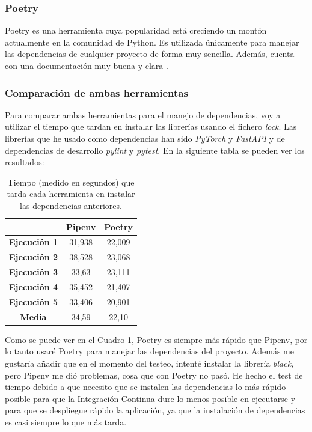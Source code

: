 \subsubsection*{Poetry}

Poetry es una herramienta cuya popularidad está creciendo un montón actualmente en la comunidad de Python. Es utilizada únicamente para manejar las dependencias de cualquier proyecto de forma muy sencilla. Además, cuenta con una documentación muy buena y clara \cite{poetry}.

\subsubsection*{Comparación de ambas herramientas}

Para comparar ambas herramientas para el manejo de dependencias, voy a utilizar el tiempo que tardan en instalar las librerías usando el fichero \textit{lock}. Las librerías que he usado como dependencias han sido \textit{PyTorch} y \textit{FastAPI} y de dependencias de desarrollo \textit{pylint} y \textit{pytest}. En la siguiente tabla se pueden ver los resultados:

\begin{table}[h]
\begin{tabular}{|c|c|c|}
\hline
                     & \textbf{Pipenv} & \textbf{Poetry} \\ \hline
\textbf{Ejecución 1} & 31,938          & 22,009          \\ \hline
\textbf{Ejecución 2} & 38,528          & 23,068          \\ \hline
\textbf{Ejecución 3} & 33,63           & 23,111          \\ \hline
\textbf{Ejecución 4} & 35,452          & 21,407          \\ \hline
\textbf{Ejecución 5} & 33,406          & 20,901          \\ \hline
\textbf{Media}       & 34,59           & 22,10           \\ \hline
\end{tabular}
\centering
\caption{Tiempo (medido en segundos) que tarda cada herramienta en instalar las dependencias anteriores.}
\label{tab:poetryvspipenv}
\end{table}

Como se puede ver en el Cuadro \ref{tab:poetryvspipenv}, Poetry es siempre más rápido que Pipenv, por lo tanto usaré Poetry para manejar las dependencias del proyecto. Además me gustaría añadir que en el momento del testeo, intenté instalar la librería \textit{black}, pero Pipenv me dió problemas, cosa que con Poetry no pasó. He hecho el test de tiempo debido a que necesito que se instalen las dependencias lo más rápido posible para que la Integración Continua dure lo menos posible en ejecutarse y para que se despliegue rápido la aplicación, ya que la instalación de dependencias es casi siempre lo que más tarda.


